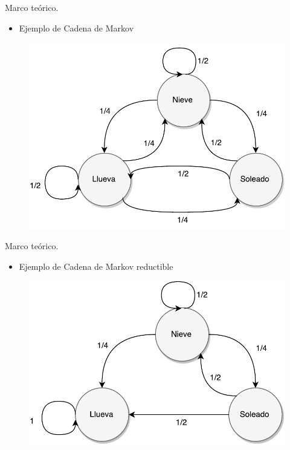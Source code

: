 \begin{frame}{Marco teórico}{\textcolor{UniBlue}{.}}
\begin{itemize}
	\item Ejemplo de Cadena de Markov
\end{itemize}

\begin{figure}[p]
	\centering
	\includegraphics[scale=0.5]{images/EjCadenaMarkov.pdf}
\end{figure}

\end{frame}

\begin{frame}{Marco teórico}{\textcolor{UniBlue}{.}}
\begin{itemize}
	\item Ejemplo de Cadena de Markov reductible
\end{itemize}

\begin{figure}[p]
	\centering
	\includegraphics[scale=0.5]{images/EjCadenaMarkov-Reductible.pdf}
\end{figure}

\end{frame}

